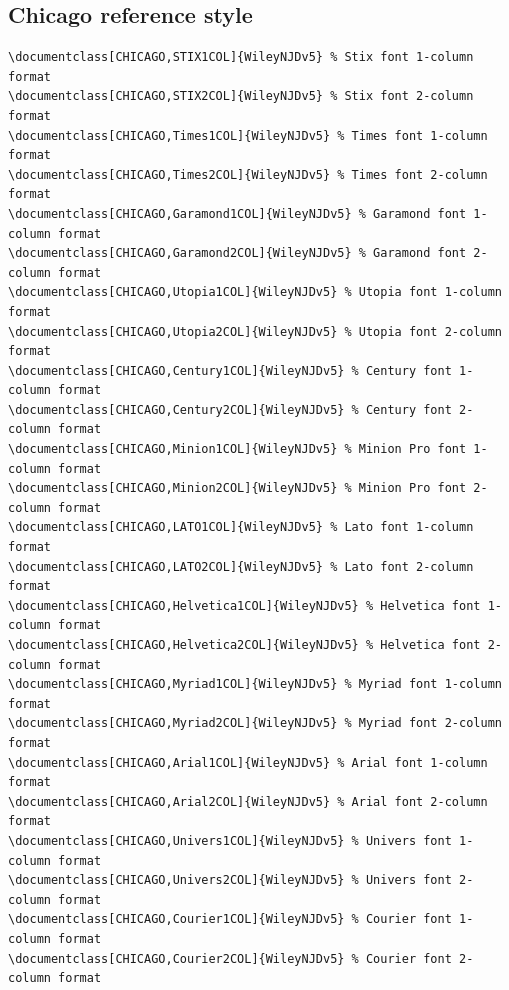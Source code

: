 \documentclass[11pt]{article}
\begin{document}
\subsection*{Chicago reference style}
{\fontsize{9}{10}\selectfont\begin{verbatim}
\documentclass[CHICAGO,STIX1COL]{WileyNJDv5} % Stix font 1-column format
\documentclass[CHICAGO,STIX2COL]{WileyNJDv5} % Stix font 2-column format
\documentclass[CHICAGO,Times1COL]{WileyNJDv5} % Times font 1-column format
\documentclass[CHICAGO,Times2COL]{WileyNJDv5} % Times font 2-column format
\documentclass[CHICAGO,Garamond1COL]{WileyNJDv5} % Garamond font 1-column format
\documentclass[CHICAGO,Garamond2COL]{WileyNJDv5} % Garamond font 2-column format
\documentclass[CHICAGO,Utopia1COL]{WileyNJDv5} % Utopia font 1-column format
\documentclass[CHICAGO,Utopia2COL]{WileyNJDv5} % Utopia font 2-column format
\documentclass[CHICAGO,Century1COL]{WileyNJDv5} % Century font 1-column format
\documentclass[CHICAGO,Century2COL]{WileyNJDv5} % Century font 2-column format
\documentclass[CHICAGO,Minion1COL]{WileyNJDv5} % Minion Pro font 1-column format
\documentclass[CHICAGO,Minion2COL]{WileyNJDv5} % Minion Pro font 2-column format
\documentclass[CHICAGO,LATO1COL]{WileyNJDv5} % Lato font 1-column format
\documentclass[CHICAGO,LATO2COL]{WileyNJDv5} % Lato font 2-column format
\documentclass[CHICAGO,Helvetica1COL]{WileyNJDv5} % Helvetica font 1-column format
\documentclass[CHICAGO,Helvetica2COL]{WileyNJDv5} % Helvetica font 2-column format
\documentclass[CHICAGO,Myriad1COL]{WileyNJDv5} % Myriad font 1-column format
\documentclass[CHICAGO,Myriad2COL]{WileyNJDv5} % Myriad font 2-column format
\documentclass[CHICAGO,Arial1COL]{WileyNJDv5} % Arial font 1-column format
\documentclass[CHICAGO,Arial2COL]{WileyNJDv5} % Arial font 2-column format
\documentclass[CHICAGO,Univers1COL]{WileyNJDv5} % Univers font 1-column format
\documentclass[CHICAGO,Univers2COL]{WileyNJDv5} % Univers font 2-column format
\documentclass[CHICAGO,Courier1COL]{WileyNJDv5} % Courier font 1-column format
\documentclass[CHICAGO,Courier2COL]{WileyNJDv5} % Courier font 2-column format
\end{verbatim}}
\end{document}
